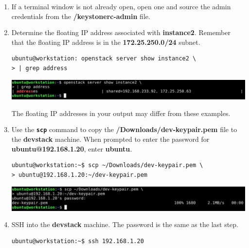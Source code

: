 \documentclass[letterpaper, 12pt]{article}
\begin{document}
\begin{enumerate}
    \item If a terminal window is not already open, open one and source the admin credentials from the 
    \textbf{\texttildemid/keystonerc-admin} file.

    \item Determine the floating IP address associated with \textbf{instance2}. Remember that the floating IP address is
    in the \textbf{172.25.250.0/24} subnet.
\begin{lstlisting}
ubuntu@workstation: openstack server show instance2 \
> | grep address
\end{lstlisting}

    \begin{center}
        \includegraphics[width=\linewidth]{images/part2/step2.png}
    \end{center}

    \begin{notebox}{}
        The floating IP addresses in your output may differ from these examples.
    \end{notebox}

    \item Use the \textbf{\texttt{scp}} command to copy the \textbf{\texttildemid/Downloads/dev-keypair.pem} file to
    the \textbf{devstack} machine. When prompted to enter the password for \textbf{ubuntu@192.168.1.20}, enter
    \textbf{ubuntu}.
\begin{lstlisting}
ubuntu@workstation:~$ scp ~/Downloads/dev-keypair.pem \
> ubuntu@192.168.1.20:~/dev-keypair.pem
\end{lstlisting}

    \begin{center}
        \includegraphics[width=\linewidth]{images/part2/step3.png}
    \end{center}

    \item SSH into the \textbf{devstack} machine. The password is the same as the last step.
\begin{lstlisting}
ubuntu@workstation:~$ ssh 192.168.1.20
\end{lstlisting}


\end{enumerate}
\end{document}

